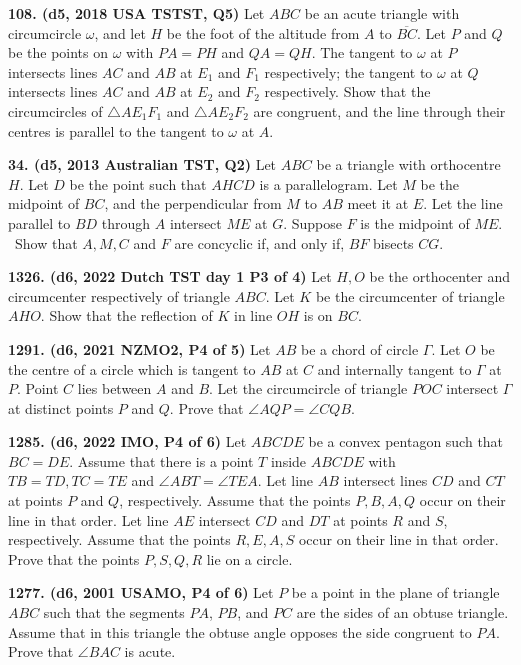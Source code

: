 \documentclass{article}
\begin{document}
\textbf{108. (\color{red}d5\color{black}, 2018 USA TSTST, Q5)} Let \(ABC\) be an acute triangle with circumcircle \(\omega\), and let \(H\) be the foot of the altitude from \(A\) to \(\overline{BC}\). Let \(P\) and \(Q\) be the points on \(\omega\) with \(PA = PH\) and \(QA = QH\). The tangent to \(\omega\) at \(P\) intersects lines \(AC\) and \(AB\) at \(E_1\) and \(F_1\) respectively; the tangent to \(\omega\) at \(Q\) intersects lines \(AC\) and \(AB\) at \(E_2\) and \(F_2\) respectively. Show that the circumcircles of \(\triangle AE_1F_1\) and \(\triangle AE_2F_2\) are congruent, and the line through their centres is parallel to the tangent to \(\omega\) at \(A\).

\textbf{34. (\color{red}d5\color{black}, 2013 Australian TST, Q2)} Let $ABC$ be a triangle with orthocentre $H$. Let $D$ be the point such that $AHCD$ is a parallelogram. Let $M$ be the midpoint of $BC$, and the perpendicular from $M$ to $AB$ meet it at $E$. Let the line parallel to $BD$ through $A$ intersect $ME$ at $G$. Suppose $F$ is the midpoint of $ME.$\
Show that $A, M, C$ and $F$ are concyclic if, and only if, $BF$ bisects $CG$.

\textbf{1326. (\color{red}d6\color{black}, 2022 Dutch TST day 1 P3 of 4)} Let $H,O$ be the orthocenter and circumcenter respectively of triangle $ABC$. Let $K$ be the circumcenter of triangle $AHO$. Show that the reflection of $K$ in line $OH$ is on $BC$.

\textbf{1291. (\color{red}d6\color{black}, 2021 NZMO2, P4 of 5)} Let \(AB\) be a chord of circle \(\Gamma\).  Let \(O\) be the centre of a circle which is tangent to \(AB\) at \(C\) and internally tangent to \(\Gamma\) at \(P\).  Point \(C\) lies between \(A\) and \(B\).  Let the circumcircle of triangle \(POC\) intersect \(\Gamma\) at distinct points \(P\) and \(Q\).  Prove that \(\angle AQP = \angle CQB\).

\textbf{1285. (\color{red}d6\color{black}, 2022 IMO, P4 of 6)} Let $ABCDE$ be a convex pentagon such that $BC=DE$. Assume that there is a point $T$ inside $ABCDE$ with $TB=TD,TC=TE$ and $\angle ABT = \angle TEA$. Let line $AB$ intersect lines $CD$ and $CT$ at points $P$ and $Q$, respectively. Assume that the points $P,B,A,Q$ occur on their line in that order. Let line $AE$ intersect $CD$ and $DT$ at points $R$ and $S$, respectively. Assume that the points $R,E,A,S$ occur on their line in that order. Prove that the points $P,S,Q,R$ lie on a circle.

\textbf{1277. (\color{red}d6\color{black}, 2001 USAMO, P4 of 6)} Let $P$ be a point in the plane of triangle $ABC$ such that the segments $PA$, $PB$, and $PC$ are the sides of an obtuse triangle. Assume that in this triangle the obtuse angle opposes the side congruent to $PA$. Prove that $\angle BAC$ is acute.
\end{document}
